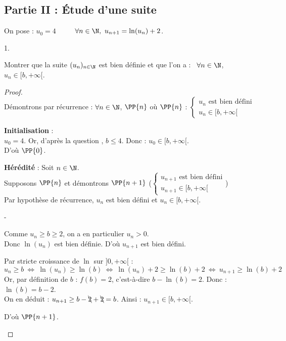 \newpage


\subsection*{Partie II : Étude d'une suite}

\noindent
On pose : $u_0=4$ \ \  \ \ $\forall n \in \N, \ u_{n+1} =
\ln(u_n) +2$.

\begin{noliste}{1.}
  \setlength{\itemsep}{4mm}
  \setcounter{enumi}{3}
\item Montrer que la suite $(u_n)_{n\in \N}$ est bien définie et que
  l'on a : \ $\forall n \in \N$, $u_n \in [b, +\infty[$.
  
  \begin{proof}~\\
    Démontrons par récurrence : $\forall n\in \N$, $\PP{n}$ \quad où
    \quad $\PP{n}$ : $\left\{
    \begin{array}{l}
      \text{$u_n$ est bien défini}\\
      u_n \in [b,+\infty[
    \end{array}
    \right.$
    \begin{noliste}{\fitem}
      \item {\bf Initialisation} : \\
      $u_0=4$. Or, d'après la question , $b \leq 4$. Donc :
      $u_0 \in [b, +\infty[$.\\
      D'où $\PP{0}$.
      
      \item {\bf Hérédité} : Soit $n\in \N$.\\
      Supposons $\PP{n}$ et démontrons $\PP{n+1}$ (\ie $\left\{
      \begin{array}{l}
        \text{$u_{n+1}$ est bien défini}\\
        u_{n+1} \in [b,+\infty[
      \end{array}
      \right.$)\\[.2cm]
      Par hypothèse de récurrence, $u_n$ est bien défini et $u_n \in 
      [b,+\infty[$.
      \begin{noliste}{-}
	\item Comme $u_n \geq b \geq 2$, on a en particulier $u_n>0$.\\
	Donc $\ln(u_n)$ est bien définie. D'où $u_{n+1}$ est bien 
	défini.
	
	\item Par stricte croissance de $\ln$ sur $]0,+\infty[$ :
	\[
	  u_n \geq b \ \Leftrightarrow \ \ln(u_n) \geq \ln(b) 
	  \ \Leftrightarrow \ \ln(u_n) +2 \geq \ln(b)+2 
	  \ \Leftrightarrow \ u_{n+1} \geq \ln(b)+2
	\]
	Or, par définition de $b$ : $f(b)=2$, c'est-à-dire 
	$b-\ln(b)=2$. Donc : $\ln(b) = b-2$.\\
	On en déduit : $u_{n+1} \geq b - \bcancel{2} + \bcancel{2}
	=b$.
	Ainsi : $u_{n+1} \in [b,+\infty[$.
      \end{noliste}
      D'où $\PP{n+1}$.
    \end{noliste}
    \conc{Par principe de récurrence, on obtient que $(u_n)$ est bien 
    définie et :
    $\forall n\in \N, \ u_n \in [b,+\infty[$.}
    

\end{proof}
\end{noliste}
